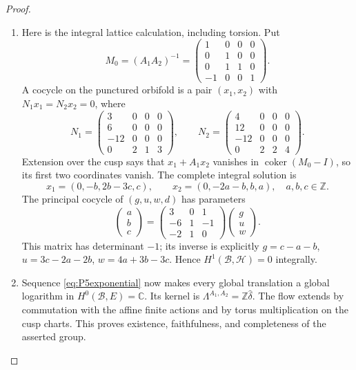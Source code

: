 \begin{proof}
\begin{enumerate}[label=\arabic*.,leftmargin=*]
\item Here is the integral lattice calculation, including torsion.  Put
\[
 M_0=(A_1A_2)^{-1}=\begin{pmatrix}1&0&0&0\\0&1&0&0\\0&1&1&0\\-1&0&0&1\end{pmatrix}.
\]
A cocycle on the punctured orbifold is a pair $(x_1,x_2)$ with
$N_1x_1=N_2x_2=0$, where
\[
 N_1=\begin{pmatrix}3&0&0&0\\6&0&0&0\\-12&0&0&0\\0&2&1&3\end{pmatrix},\qquad
 N_2=\begin{pmatrix}4&0&0&0\\12&0&0&0\\-12&0&0&0\\0&2&2&4\end{pmatrix}.
\]
Extension over the cusp says that $x_1+A_1x_2$ vanishes in
$\operatorname{coker}(M_0-I)$, so its first two coordinates vanish.
The complete integral solution is
\[
 x_1=(0,-b,2b-3c,c),\qquad x_2=(0,-2a-b,b,a),\quad a,b,c\in\mathbb Z.
\]
The principal cocycle of $(g,u,w,d)$ has parameters
\[
 \begin{pmatrix}a\\b\\c\end{pmatrix}
 =\begin{pmatrix}3&0&1\\-6&1&-1\\-2&1&0\end{pmatrix}
  \begin{pmatrix}g\\u\\w\end{pmatrix}.
\]
This matrix has determinant $-1$; its inverse is explicitly
$g=c-a-b$, $u=3c-2a-2b$, $w=4a+3b-3c$.  Hence
$H^1(\mathcal B,\mathcal H)=0$ integrally.

\item Sequence \eqref{eq:P5exponential} now makes every global translation a
global logarithm in $H^0(\mathcal B,E)=\mathbb C$.  Its kernel is
$\Lambda^{A_1,A_2}=\mathbb Z\widehat\delta$.  The flow extends by
commutation with the affine finite actions and by torus multiplication
on the cusp charts.  This proves existence, faithfulness, and
completeness of the asserted group.
\end{enumerate}
\end{proof}